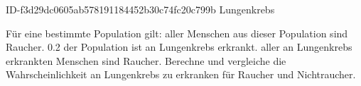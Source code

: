 \begin{exercise}
      {ID-f3d29dc0605ab578191184452b30c74fc20c799b}
      {Lungenkrebs}
  \ifproblem\problem\par
    Für eine bestimmte Population gilt:  aller Menschen aus dieser Population
    sind Raucher. \num{0.2} der Population ist an Lungenkrebs erkrankt.  aller
    an Lungenkrebs erkrankten Menschen sind Raucher. Berechne und vergleiche die
    Wahrscheinlichkeit an Lungenkrebs zu erkranken für Raucher und Nichtraucher.
  \fi
\end{exercise}
